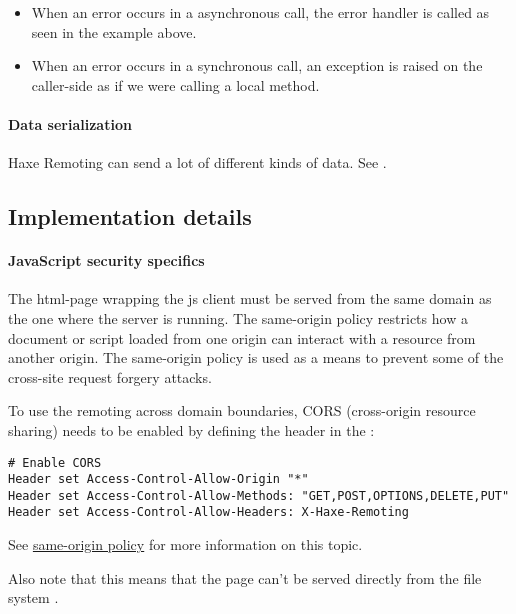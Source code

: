 \begin{itemize}
	\item When an error occurs in a asynchronous call, the error handler is called as seen in the example above.
	\item When an error occurs in a synchronous call, an exception is raised on the caller-side as if we were calling a local method.
\end{itemize}

\paragraph{Data serialization}

Haxe Remoting can send a lot of different kinds of data. See .

\subsection{Implementation details}
\label{std-remoting-implementation-details}

\paragraph{JavaScript security specifics}

The html-page wrapping the js client must be served from the same domain as the one where the server is running. The same-origin policy restricts how a document or script loaded from one origin can interact with a resource from another origin. The same-origin policy is used as a means to prevent some of the cross-site request forgery attacks.

To use the remoting across domain boundaries, CORS (cross-origin resource sharing) needs to be enabled by defining the header  in the :

\begin{lstlisting} 
# Enable CORS
Header set Access-Control-Allow-Origin "*"
Header set Access-Control-Allow-Methods: "GET,POST,OPTIONS,DELETE,PUT"
Header set Access-Control-Allow-Headers: X-Haxe-Remoting
\end{lstlisting} 

See \href{http://en.wikipedia.org/wiki/Same-origin_policy}{same-origin policy} for more information on this topic.

Also note that this means that the page can't be served directly from the file system .

